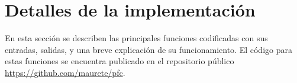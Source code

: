 %
%
\section{Detalles de la implementación}
%
En esta sección se describen las principales funciones codificadas con
sus entradas, salidas, y una breve explicación de su funcionamiento.
El código para estas funciones se encuentra publicado en el
repositorio público \url{https://github.com/maurete/pfc}.
